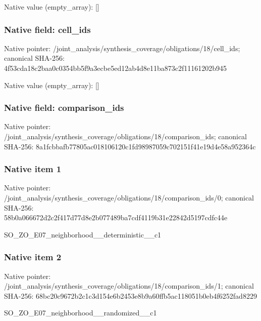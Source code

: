 \documentclass[10pt,a4paper]{article}
\begin{document}
Native value (empty\_\allowbreak{}array): []

\subsubsection{Native field: cell\_\allowbreak{}ids}
Native pointer: /joint\_\allowbreak{}analysis/synthesis\_\allowbreak{}coverage/obligations/18/cell\_\allowbreak{}ids; canonical SHA-256: 4f53cda18c2baa0c0354bb5f9a3ecbe5ed12ab4d8e11ba873c2f11161202b945

Native value (empty\_\allowbreak{}array): []

\subsubsection{Native field: comparison\_\allowbreak{}ids}
Native pointer: /joint\_\allowbreak{}analysis/synthesis\_\allowbreak{}coverage/obligations/18/comparison\_\allowbreak{}ids; canonical SHA-256: 8a1fcbbafb77805ac018106120c1fd98987059c702151f41e19d4e58a952364c

\subsubsection{Native item 1}
Native pointer: /joint\_\allowbreak{}analysis/synthesis\_\allowbreak{}coverage/obligations/18/comparison\_\allowbreak{}ids/0; canonical SHA-256: 58b0a066672d2c2f417d77d8e2b077489ba7cdf4119b31e22842d5197cdfc44e

\begingroup\raggedright\sloppy SO\_\allowbreak{}ZO\_\allowbreak{}E07\_\allowbreak{}neighborhood\_\allowbreak{}\_\allowbreak{}deterministic\_\allowbreak{}\_\allowbreak{}c1\par\endgroup

\subsubsection{Native item 2}
Native pointer: /joint\_\allowbreak{}analysis/synthesis\_\allowbreak{}coverage/obligations/18/comparison\_\allowbreak{}ids/1; canonical SHA-256: 68bc20c9672b2c1c3d154e6b2453e8b9a60ffb5ac118051b0eb4f6252fad8229

\begingroup\raggedright\sloppy SO\_\allowbreak{}ZO\_\allowbreak{}E07\_\allowbreak{}neighborhood\_\allowbreak{}\_\allowbreak{}randomized\_\allowbreak{}\_\allowbreak{}c1\par\endgroup
\end{document}
